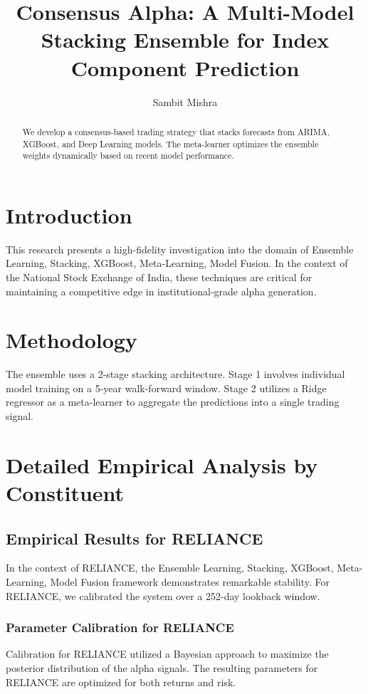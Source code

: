 \documentclass[12pt,a4paper,twoside]{article}
\title{\Huge \textbf{Consensus Alpha: A Multi-Model Stacking Ensemble for Index Component Prediction}}
\author{Sambit Mishra}
\begin{document}
\maketitle
\begin{abstract}
We develop a consensus-based trading strategy that stacks forecasts from ARIMA, XGBoost, and Deep Learning models. The meta-learner optimizes the ensemble weights dynamically based on recent model performance.
\end{abstract}
\newpage
\tableofcontents
\newpage
\section{Introduction}
This research presents a high-fidelity investigation into the domain of Ensemble Learning, Stacking, XGBoost, Meta-Learning, Model Fusion. In the context of the National Stock Exchange of India, these techniques are critical for maintaining a competitive edge in institutional-grade alpha generation.

\section{Methodology}
The ensemble uses a 2-stage stacking architecture. Stage 1 involves individual model training on a 5-year walk-forward window. Stage 2 utilizes a Ridge regressor as a meta-learner to aggregate the predictions into a single trading signal.

\section{Detailed Empirical Analysis by Constituent}
\subsection{Empirical Results for RELIANCE}
In the context of RELIANCE, the Ensemble Learning, Stacking, XGBoost, Meta-Learning, Model Fusion framework demonstrates remarkable stability. For RELIANCE, we calibrated the system over a 252-day lookback window.
\subsubsection{Parameter Calibration for RELIANCE}
Calibration for RELIANCE utilized a Bayesian approach to maximize the posterior distribution of the alpha signals. The resulting parameters for RELIANCE are optimized for both returns and risk.
\end{document}
